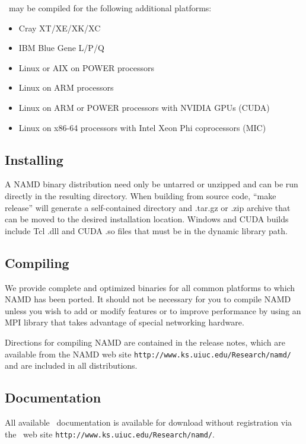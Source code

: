 \NAMD\ may be compiled for the following additional platforms:

\begin{itemize}
\item Cray XT/XE/XK/XC
\item IBM Blue Gene L/P/Q
\item Linux or AIX on POWER processors
\item Linux on ARM processors
\item Linux on ARM or POWER processors with NVIDIA GPUs (CUDA)
\item Linux on x86-64 processors with Intel Xeon Phi coprocessors (MIC)
\end{itemize}

\subsection{Installing \NAMD}

A NAMD binary distribution need only be untarred or unzipped and can
be run directly in the resulting directory.  When building from source
code, ``make release'' will generate a
self-contained directory and .tar.gz or .zip archive that can be moved
to the desired installation location.  Windows and CUDA builds include
Tcl .dll and CUDA .so files that must be in the dynamic library path.

\subsection{Compiling \NAMD}

We provide complete and optimized binaries for all
common platforms to which NAMD has been ported.
It should not be necessary for you to compile
NAMD unless you wish to add or modify features
or to improve performance by using an MPI library
that takes advantage of special networking hardware.

Directions for compiling NAMD are contained in the release notes,
which are available from the NAMD web site
{\tt http://www.ks.uiuc.edu/Research/namd/}
and are included in all distributions.

\subsection{Documentation}

All available \NAMD\ documentation is available for download without
registration via the \NAMD\ web site
{\tt http://www.ks.uiuc.edu/Research/namd/}.

